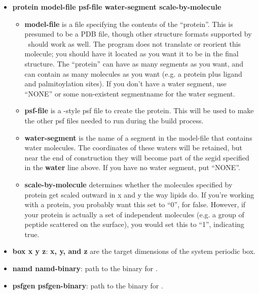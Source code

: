 \documentclass[12pt]{article}
\begin{document}
\begin{itemize}
     \item {\bf protein model-file psf-file water-segment scale-by-molecule}
          \begin{itemize}
            \item {\bf model-file} is a file specifying the contents of the
            ``protein''.  This is presumed to be a PDB file, though other
            structure formats supported by \loos\ should work as well.  The
            program does not translate or reorient this molecule; you
            should have it located as you want it to be in the final
            structure.   The ``protein'' can have as many segments as you
            want, and can contain as many molecules as you want (e.g. a
            protein plus ligand and palmitoylation sites).  If you don't
            have a water segment, use ``NONE'' or some non-existent
            segmentname for the water segment.

            \item {\bf psf-file} is a \namd-style psf file to create the
            protein.  This will be used to make the other psf files needed
        to run {\namd} during the build process.  \item {\bf water-segment}
            is the name of a segment in the model-file that contains water
            molecules.  The coordinates of these waters will be retained,
            but near the end of construction they will become part of the
            segid specified in the {\bf water} line above.  If you have no
            water segment, put ``NONE''.

            \item{\bf scale-by-molecule} determines whether the molecules
                specified by protein get scaled outward in x and y the way
                lipids do.  If you're working with a protein, you probably
                want this set to ``0'', for false.  However, if your
                protein is actually a set of independent molecules (e.g. a
                group of peptide scattered on the surface), you would set
                this to ``1'', indicating true.

          \end{itemize}
     \item {\bf box x y z}: {\bf x, y, and z} are the target dimensions of the
            system periodic box.  
     \item {\bf namd namd-binary}: path to the binary for \namd.
     \item {\bf psfgen psfgen-binary}: path to the binary for \psfgen.

\end{itemize}
\end{document}
